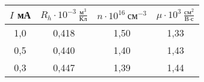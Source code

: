 \begin{table}[h!]
    \begin{center}
        \begin{tabular}{|c|c|c|c|}
            \hline
            $I$  мА & $R_h \cdot 10^{-3} ~ \frac{\text{м}^3}{\text{Кл}}$ & $n \cdot 10^{16} ~ \text{см}^{-3}$ & $\mu \cdot 10^3 ~ \frac{\text{см}^2}{\text{В} \cdot \text{с}}$  \\ \hline
            1,0     & 0,418                                              & 1,50                               & 1,33                                                            \\ \hline
            0,5     & 0,440                                              & 1,40                               & 1,43                                                            \\ \hline
            0,3     & 0,447                                              & 1,39                               & 1,44                                                            \\ \hline                
        \end{tabular}
    \end{center}
    \caption{}
\end{table}